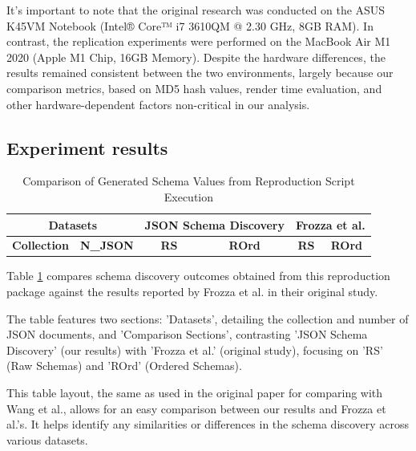 \documentclass[sigconf, nonacm]{acmart}
\begin{document}
It's important to note that the original research was conducted on the ASUS K45VM Notebook (Intel® Core™ i7 3610QM @ 2.30 GHz, 8GB RAM). In contrast, the replication experiments were performed on the MacBook Air M1 2020 (Apple M1 Chip, 16GB Memory). Despite the hardware differences, the results remained consistent between the two environments, largely because our comparison metrics, based on MD5 hash values, render time evaluation, and other hardware-dependent factors non-critical in our analysis.

\subsection{Experiment results}

\begin{table}
\centering
\caption{Comparison of Generated Schema Values from Reproduction Script Execution} \label{results-table}
\scalebox{0.80} {
\begin{tabular}{|l|c|c|c|c|c|}
\hline
\multicolumn{2}{|c|}{\textbf{Datasets}} & \multicolumn{2}{c|}{\textbf{JSON Schema Discovery}} &
\multicolumn{2}{c|}{\textbf{Frozza et al. \cite{JsonSchemaDiscovery}}} \\
\hline
\textbf{Collection} & \textbf{N\_JSON} & \textbf{RS} & \textbf{ROrd} & \textbf{RS} & \textbf{ROrd} \\
\hline

\end{tabular}
}

\end{table}

Table \ref{results-table} compares schema discovery outcomes obtained from this reproduction package against the results reported by Frozza et al. in their original study.

The table features two sections: 'Datasets', detailing the collection and number of JSON documents, and 'Comparison Sections', contrasting 'JSON Schema Discovery' (our results) with 'Frozza et al.' (original study), focusing on 'RS' (Raw Schemas) and 'ROrd' (Ordered Schemas).

This table layout, the same as used in the original paper for comparing with Wang et al., allows for an easy comparison between our results and Frozza et al.'s. It helps identify any similarities or differences in the schema discovery across various datasets.

\end{document}
